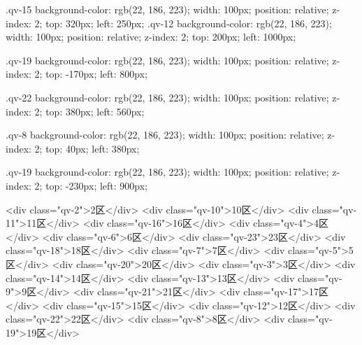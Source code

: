 .qv-15{
    background-color: rgb(22, 186, 223);
    width: 100px;
    position: relative;
    z-index: 2;
    top: 320px;
    left: 250px;
}
.qv-12{
    background-color: rgb(22, 186, 223);
    width: 100px;
    position: relative;
    z-index: 2;
    top: 200px;
    left: 1000px;
}

.qv-19{
    background-color: rgb(22, 186, 223);
    width: 100px;
    position: relative;
    z-index: 2;
    top: -170px;
    left: 800px;
}

.qv-22{
    background-color: rgb(22, 186, 223);
    width: 100px;
    position: relative;
    z-index: 2;
    top: 380px;
    left: 560px;
}

.qv-8{
    background-color: rgb(22, 186, 223);
    width: 100px;
    position: relative;
    z-index: 2;
    top: 40px;
    left: 380px;
}

.qv-19{
    background-color: rgb(22, 186, 223);
    width: 100px;
    position: relative;
    z-index: 2;
    top: -230px;
    left: 900px;
}

<div class="qv-2">2区</div>
<div class="qv-10">10区</div>
<div class="qv-11">11区</div>
<div class="qv-16">16区</div>
<div class="qv-4">4区</div>
<div class="qv-6">6区</div>
<div class="qv-23">23区</div>
<div class="qv-18">18区</div>
<div class="qv-7">7区</div>
<div class="qv-5">5区</div>
<div class="qv-20">20区</div>
<div class="qv-3">3区</div>
<div class="qv-14">14区</div>
<div class="qv-13">13区</div>
<div class="qv-9">9区</div>
<div class="qv-21">21区</div>
<div class="qv-17">17区</div>
<div class="qv-15">15区</div>
<div class="qv-12">12区</div>
<div class="qv-22">22区</div>
<div class="qv-8">8区</div>
<div class="qv-19">19区</div>